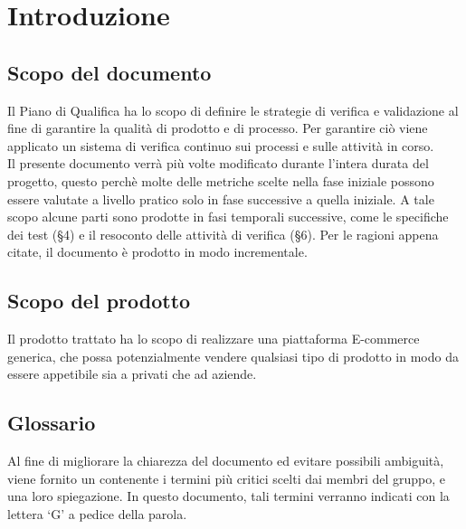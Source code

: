 \section{Introduzione}

\subsection{Scopo del documento}
Il Piano di Qualifica ha lo scopo di definire le strategie di verifica e validazione al fine di garantire la qualità di prodotto e di processo. Per garantire ciò viene applicato un sistema di verifica continuo sui processi e sulle attività in corso.\\
Il presente documento verrà più volte modificato durante l'intera durata del progetto, questo perchè molte delle metriche scelte nella fase iniziale possono essere valutate a livello pratico solo in fase successive a quella iniziale. A tale scopo alcune parti sono prodotte in fasi temporali successive, come le specifiche dei test (§4) e il resoconto delle attività di verifica (§6). Per le ragioni appena citate, il documento è prodotto in modo incrementale.

\subsection{Scopo del prodotto}
Il prodotto trattato ha lo scopo di realizzare una piattaforma E-commerce generica, che possa potenzialmente vendere qualsiasi tipo di prodotto in modo da essere appetibile sia a privati che ad aziende.

\subsection{Glossario}
Al fine di migliorare la chiarezza del documento ed evitare possibili ambiguità, viene fornito un
\Glossario{} contenente i termini più critici scelti dai membri del gruppo, e una loro spiegazione.
In questo documento, tali termini verranno indicati con la lettera `G’ a pedice della parola.


